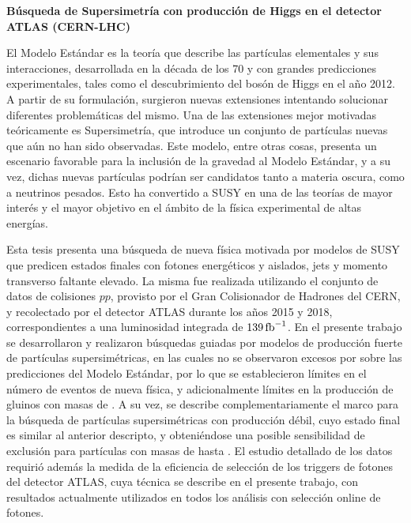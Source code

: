 {\centering \bf \Large  Búsqueda de Supersimetría con producción de Higgs en el detector ATLAS (CERN-LHC)\\}

\vspace{2cm}

El Modelo Estándar es la teoría que describe las partículas elementales y sus interacciones, desarrollada en la década de los 70 y con grandes predicciones experimentales, tales como el descubrimiento del bosón de Higgs en el año 2012. A partir de su formulación, surgieron nuevas extensiones intentando solucionar diferentes problemáticas del mismo. Una de las extensiones mejor motivadas teóricamente es Supersimetría, que introduce un conjunto de partículas nuevas que aún no han sido observadas. Este modelo, entre otras cosas, presenta un escenario favorable para la inclusión de la gravedad al Modelo Estándar, y a su vez, dichas nuevas partículas podrían ser candidatos tanto a materia oscura, como a neutrinos pesados. Esto ha convertido a SUSY en una de las teorías de mayor interés y el mayor objetivo en el ámbito de la física experimental de altas energías.

Esta tesis presenta una búsqueda de nueva física motivada por modelos de SUSY que predicen estados finales con fotones energéticos y aislados, jets y momento transverso faltante elevado. La misma fue realizada utilizando el conjunto de datos de colisiones $pp$, provisto por el Gran Colisionador de Hadrones del CERN, y recolectado por el detector ATLAS durante los años 2015 y 2018, correspondientes a una luminosidad integrada de $139\,\text{fb}^{-1}$. En el presente trabajo se desarrollaron y realizaron búsquedas guiadas por modelos de producción fuerte de partículas supersimétricas, en las cuales no se observaron excesos por sobre las predicciones del Modelo Estándar, por lo que se establecieron límites en el número de eventos de nueva física, y adicionalmente límites en la producción de gluinos con masas de . A su vez, se describe complementariamente el marco para la búsqueda de partículas supersimétricas con producción débil, cuyo estado final es similar al anterior descripto, y obteniéndose una posible sensibilidad de exclusión para partículas con masas de hasta .
El estudio detallado de los datos requirió además la medida de la eficiencia de selección de los triggers de fotones del detector ATLAS, cuya técnica se describe en el presente trabajo, con resultados actualmente utilizados en todos los análisis con selección online de fotones.

